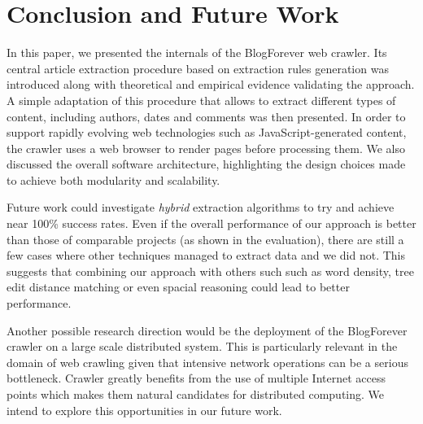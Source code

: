 \section{Conclusion and Future Work}
In this paper, we presented the internals of the BlogForever web crawler. Its central article extraction procedure based on extraction rules generation was introduced along with theoretical and empirical evidence validating the approach. A simple adaptation of this procedure that allows to extract different types of content, including authors, dates and comments was then presented. In order to support rapidly evolving web technologies such as JavaScript-generated content, the crawler uses a web browser to render pages before processing them. We also discussed the overall software architecture, highlighting the design choices made to achieve both modularity and scalability.

Future work could investigate \emph{hybrid} extraction algorithms to try and achieve near 100\% success rates. Even if the overall performance of our approach is better than those of comparable projects (as shown in the evaluation), there are still a few cases where other techniques managed to extract data and we did not. This suggests that combining our approach with others such such as word density, tree edit distance matching or even spacial reasoning could lead to better performance.

Another possible research direction would be the deployment of the BlogForever crawler on a large scale distributed system. This is particularly relevant in the domain of web crawling given that intensive network operations can be a serious bottleneck. Crawler greatly benefits from the use of multiple Internet access points which makes them natural candidates for distributed computing. We intend to explore this opportunities in our future work.
